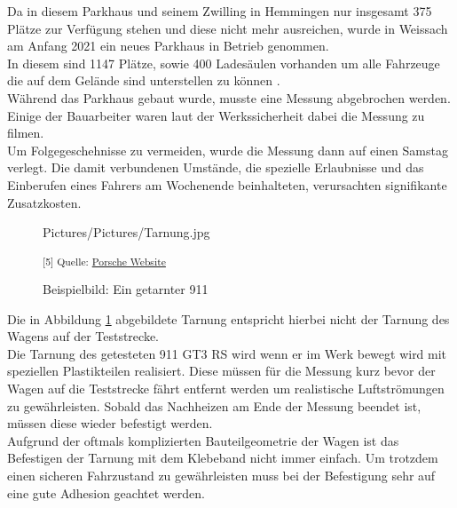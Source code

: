 Da in diesem Parkhaus und seinem Zwilling in Hemmingen nur insgesamt 375 Plätze zur Verfügung stehen und diese nicht mehr ausreichen, wurde in Weissach am Anfang 2021 ein neues Parkhaus in Betrieb genommen. \\
In diesem sind 1147 Plätze, sowie 400 Ladesäulen vorhanden um alle Fahrzeuge die auf dem Gelände sind unterstellen zu können \cite{PTPark}. \\

Während das Parkhaus gebaut wurde, musste eine Messung abgebrochen werden. Einige der Bauarbeiter waren laut der Werkssicherheit dabei die Messung zu filmen. \\
Um Folgegeschehnisse zu vermeiden, wurde die Messung dann auf einen Samstag verlegt. Die damit verbundenen Umstände, die spezielle Erlaubnisse und das Einberufen eines Fahrers am Wochenende beinhalteten, verursachten signifikante Zusatzkosten. \\

\begin{figure}[H]
	\begin{center}
		\begin{overpic}[width=\linewidth]{Pictures/Pictures/Tarnung.jpg}
			
		\end{overpic}
		
		\label{Tarnung}
		\caption{Beispielbild: Ein getarnter 911}
		\small\textsuperscript{[5] Quelle: \href{https://presse.porsche.de/prod/presse_pag/PressResources.nsf/Content?ReadForm&languageversionid=832808&hl=christophorus-385-dynamic-bastion-of-stability}{Porsche Website}}
	\end{center}
\end{figure} 

Die in Abbildung \ref{Tarnung} abgebildete Tarnung entspricht hierbei nicht der Tarnung des Wagens auf der Teststrecke. \\
Die Tarnung des getesteten 911 GT3 RS wird wenn er im Werk bewegt wird mit speziellen Plastikteilen realisiert. Diese müssen für die Messung kurz bevor der Wagen auf die Teststrecke fährt entfernt werden um realistische Luftströmungen zu gewährleisten. Sobald das Nachheizen am Ende der Messung beendet ist, müssen diese wieder befestigt werden.\\

Aufgrund der oftmals komplizierten Bauteilgeometrie der Wagen ist das Befestigen der Tarnung mit dem Klebeband nicht immer einfach. Um trotzdem einen sicheren Fahrzustand zu gewährleisten muss bei der Befestigung sehr auf eine gute Adhesion geachtet werden.\\

